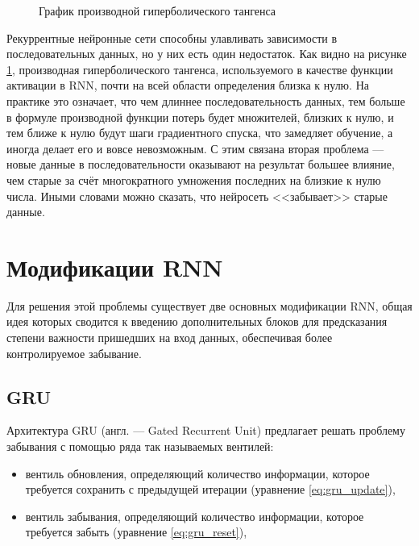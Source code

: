 \begin{figure}
    \centering
    \caption{График производной гиперболического тангенса}
    \label{fig:tanh_der}
\end{figure}

Рекуррентные нейронные сети способны улавливать зависимости в последовательных данных, но у них есть один недостаток. Как видно на рисунке \ref*{fig:tanh_der}, производная гиперболического тангенса, используемого в качестве функции активации в RNN, почти на всей области определения близка к нулю. На практике это означает, что чем длиннее последовательность данных, тем больше в формуле производной функции потерь будет множителей, близких к нулю, и тем ближе к нулю будут шаги градиентного спуска, что замедляет обучение, а иногда делает его и вовсе невозможным. С этим связана вторая проблема --- новые данные в последовательности оказывают на результат большее влияние, чем старые за счёт многократного умножения последних на близкие к нулю числа. Иными словами можно сказать, что нейросеть <<забывает>> старые данные.

\section{Модификации RNN}

Для решения этой проблемы существует две основных модификации RNN, общая идея которых сводится к введению дополнительных блоков для предсказания степени важности пришедших на вход данных, обеспечивая более контролируемое забывание.

\subsection{GRU}

Архитектура GRU (англ. --- Gated Recurrent Unit) предлагает решать проблему забывания с помощью ряда так называемых вентилей:
\begin{itemize}
    \item вентиль обновления, определяющий количество информации, которое требуется сохранить с предыдущей итерации (уравнение \ref*{eq:gru_update}),
    \item вентиль забывания, определяющий количество информации, которое требуется забыть (уравнение \ref*{eq:gru_reset}),
\end{itemize}

